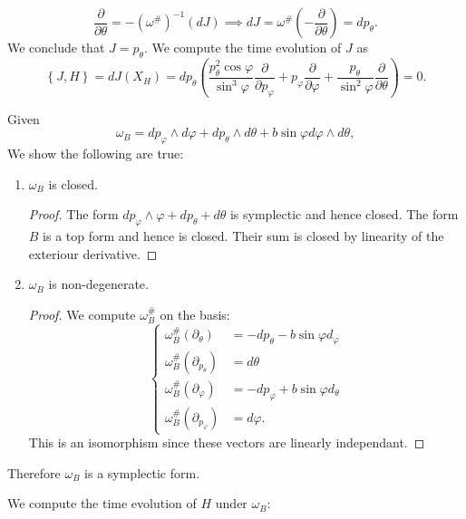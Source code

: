 \documentclass[12pt, a4paper]{article}
\theoremstyle{definition}
\begin{document}
	$$ \frac{ \partial  }{ \partial \theta } = - \left(\omega^\# \right)^{-1} (dJ) \implies dJ = \omega^\# \left( - \frac{ \partial  }{ \partial \theta } \right) = dp_{\theta}.$$ 
We conclude that $J= p_\theta.$
We compute the time evolution of $J$ as
$$ \left\{ J,H \right\} = dJ(X_H) =  dp_\theta \left( \frac{ p_\theta^2 \cos \varphi }{ \sin^3 \varphi } \frac{ \partial  }{ \partial p_\varphi } + p_\varphi \frac{ \partial  }{ \partial \varphi } + \frac{ p_\theta }{ \sin^2 \varphi } \frac{ \partial  }{ \partial \theta }  \right)  = 0.$$ 
\item Given $$ \omega_B = dp_\varphi \wedge d \varphi + dp_\theta \wedge d\theta + b \sin \varphi d \varphi \wedge d \theta, $$ 
We show the following are true:
\begin{enumerate}[label = \textbf{\roman*)}, leftmargin = 0pt]
	\item $\omega_B$ is closed. 
		\begin{proof}
The form $dp_\varphi \wedge \varphi + dp_\theta + d\theta$ is symplectic and hence closed. The form $B$ is a top form and hence is closed. Their sum is closed by linearity of the exteriour derivative.
		\end{proof}
	\item $\omega_B$ is non-degenerate. 
		\begin{proof}
		We compute $\omega_B^\#$ on the basis:
			$$ \begin{cases} 
				\omega_B^\# \left( \partial_\theta \right) &= - dp_\theta - b \sin \varphi d_\varphi
				\\ \omega_B^\# \left( \partial_{p_\theta} \right) & = d\theta
				\\ \omega_B^\# \left( \partial_\varphi \right) & = -dp_\varphi	+ b \sin \varphi d_\theta
				\\ \omega^\#_B \left( \partial_{p_\varphi} \right)& = d\varphi.
			\end{cases}$$ 
This is an isomorphism since these vectors are linearly independant. 
	\end{proof}
\end{enumerate}
Therefore $\omega_B$ is a symplectic form. 
\item We compute the time evolution of $H$ under $\omega_B$:
\end{document}

